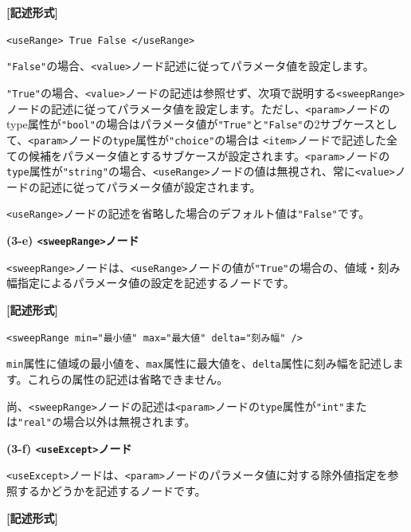 \documentclass[a4paper,11pt]{jarticle}
\begin{document}
{\vspace{8pt}
\leftskip=12pt
\textbf{[記述形式]}

\leftskip=42pt
\texttt{<useRange> True \textbar{} False </useRange>}

\vspace{8pt}
\leftskip=0pt
\texttt{"False"}の場合、\texttt{<value>}ノード記述に従ってパラメータ値を設定します。

\texttt{"True"}の場合、\texttt{<value>}ノードの記述は参照せず、次項で説明する\texttt{<sweepRange>}ノードの記述に従ってパラメータ値を設定します。ただし、\texttt{<param>}ノードのtype属性が\texttt{"bool"}の場合はパラメータ値が\texttt{"True"}と\texttt{"False"}の2サブケースとして、\texttt{<param>}ノードの{\tt type}属性が\texttt{"choice"}の場合は 
\texttt{<item>}ノードで記述した全ての候補をパラメータ値とするサブケースが設定されます。\texttt{<param>}ノードの{\tt type}属性が\texttt{"string"}の場合、\texttt{<useRange>}ノードの値は無視され、常に\texttt{<value>}ノードの記述に従ってパラメータ値が設定されます。

\texttt{<useRange>}ノードの記述を省略した場合のデフォルト値は\texttt{"False"}です。

\vspace{12pt}
\textbf{(3-e) \texttt{<sweepRange>}ノード}

\texttt{<sweepRange>}ノードは、\texttt{<useRange>}ノードの値が\texttt{"True"}の場合の、値域・刻み幅指定によるパラメータ値の設定を記述するノードです。

\vspace{8pt}
\leftskip=12pt
\textbf{[記述形式]}

\leftskip=42pt
\texttt{<sweepRange  min="最小値"  max="最大値"  delta="刻み幅" />}

\vspace{8pt}
\leftskip=0pt
{\tt min}属性に値域の最小値を、{\tt max}属性に最大値を、{\tt delta}属性に刻み幅を記述します。これらの属性の記述は省略できません。

尚、\texttt{<sweepRange>}ノードの記述は\texttt{<param>}ノードの{\tt type}属性が\texttt{"int"}または\texttt{"real"}の場合以外は無視されます。

\vspace{12pt}
\textbf{(3-f) \texttt{<useExcept>}ノード}

\texttt{<useExcept>}ノードは、\texttt{<param>}ノードのパラメータ値に対する除外値指定を参照するかどうかを記述するノードです。

\vspace{8pt}
\leftskip=12pt
\textbf{[記述形式]}

}
\end{document}
